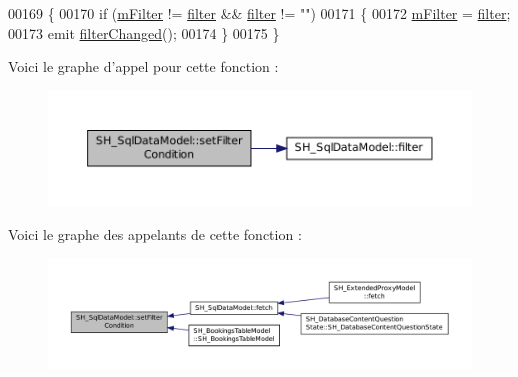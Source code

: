 \begin{DoxyCode}
00169 \{
00170     \textcolor{keywordflow}{if} (\hyperlink{classSH__SqlDataModel_af83c15ae3ad1dc4617dd58f2a852a1e2}{mFilter} != \hyperlink{classSH__SqlDataModel_aa86018df823c85798574ec8d63413c1a}{filter} && \hyperlink{classSH__SqlDataModel_aa86018df823c85798574ec8d63413c1a}{filter} != \textcolor{stringliteral}{""})
00171     \{
00172         \hyperlink{classSH__SqlDataModel_af83c15ae3ad1dc4617dd58f2a852a1e2}{mFilter} = \hyperlink{classSH__SqlDataModel_aa86018df823c85798574ec8d63413c1a}{filter};
00173         emit \hyperlink{classSH__SqlDataModel_ab7bf039eba1e085b137509b7b93ea39b}{filterChanged}();
00174     \}
00175 \}
\end{DoxyCode}


Voici le graphe d'appel pour cette fonction \-:\nopagebreak
\begin{figure}[H]
\begin{center}
\leavevmode
\includegraphics[width=350pt]{classSH__SqlDataModel_a99c6317027a7c9f723215b53b69e0647_cgraph}
\end{center}
\end{figure}




Voici le graphe des appelants de cette fonction \-:\nopagebreak
\begin{figure}[H]
\begin{center}
\leavevmode
\includegraphics[width=350pt]{classSH__SqlDataModel_a99c6317027a7c9f723215b53b69e0647_icgraph}
\end{center}
\end{figure}


